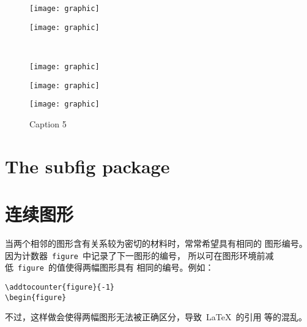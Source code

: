 \begin{figure} 
	\centering 
	\begin{minipage}[b]{0.3\textwidth} 
		\centering 
		\texttt{[image: graphic]} 
		\caption{Caption 1}\label{fig:stacked:a}
	\end{minipage}%
	\hspace{0.04\textwidth}%
	\begin{minipage}[b]{0.3\textwidth} 
		\centering 
		\texttt{[image: graphic]} 
		\caption{Caption 2} \label{fig:stacked:b}
	\end{minipage}\\[20pt] 
	\begin{minipage}[b]{0.3\textwidth} 
		\centering 
		\texttt{[image: graphic]} 
		\caption{Caption 3} \label{fig:stacked:c}
	\end{minipage}%
	\hspace{0.04\linewidth}%
	\begin{minipage}[b]{0.3\textwidth} 
		\centering 
		\texttt{[image: graphic]} 
		\caption{Caption 4} \label{fig:stacked:d}
	\end{minipage}%
	\hspace{0.04\linewidth}%
	\begin{minipage}[b]{0.3\textwidth} 
		\centering 
		\texttt{[image: graphic]} 
		\caption{Caption 5} \label{fig:stacked:e}
	\end{minipage} 
\end{figure}

\section{The subfig package}

\section{连续图形}

当两个相邻的图形含有关系较为密切的材料时，常常希望具有相同的
图形编号。因为计数器~\texttt{figure}~中记录了下一图形的编号，
所以可在图形环境前减低~\texttt{figure}~的值使得两幅图形具有
相同的编号。例如：
\begin{Verbatim}[xleftmargin=1cm]
\addtocounter{figure}{-1} 
\begin{figure}
\end{Verbatim}
不过，这样做会使得两幅图形无法被正确区分，导致~\LaTeX{}~的引用
等的混乱。

